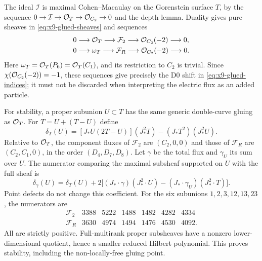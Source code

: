 The ideal $\mathcal I$ is maximal Cohen--Macaulay on the Gorenstein
surface $T$, by the sequence
$0\to\mathcal I\to\mathcal O_T\to\mathcal O_{C_2}\to0$ and the depth lemma.
Duality gives pure sheaves in \eqref{eq:x9-glued-sheaves} and sequences
\begin{equation}
 \begin{aligned}
 0&\longrightarrow\mathcal O_T\longrightarrow\mathcal F_2
       \longrightarrow\mathcal O_{C_2}(-2)\longrightarrow0,\\
 0&\longrightarrow\omega_T\longrightarrow\mathcal F_R
       \longrightarrow\mathcal O_{C_2}(-2)\longrightarrow0.
 \end{aligned}
 \label{eq:x9-glued-extensions}
\end{equation}
Here $\omega_T=\mathcal O_T(P_6)=\mathcal O_T(C_1)$, and its restriction to
$C_2$ is trivial. Since $\chi(\mathcal O_{C_2}(-2))=-1$, these sequences
give precisely the D0 shift in \eqref{eq:x9-glued-indices}; it must
not be discarded when interpreting the electric flux as an added
particle.

For stability, a proper subunion $U\subset T$ has the same generic
double-curve gluing as $\mathcal O_T$. For $T=U+(T-U)$ define
\[
 \delta_T(U)=[J_*U(2T-U)](J_*^2T)-(J_*T^2)(J_*^2U).
\]
Relative to $\mathcal O_T$, the component
fluxes of $\mathcal F_2$ are $(C_2,0,0)$ and those of
$\mathcal F_R$ are $(C_2,C_1,0)$, in the order $(D_4,D_7,D_8)$.
Let $\gamma$ be the total flux and $\gamma_U$ its sum over $U$.
The numerator comparing the maximal subsheaf supported on $U$ with
the full sheaf is
\begin{equation}
 \delta_{\gamma}(U)=\delta_T(U)
   +2\big[(J_*\cdot\gamma)(J_*^2\cdot U)
          -(J_*\cdot\gamma_U)(J_*^2\cdot T)\big].
 \label{eq:x9-glued-stability}
\end{equation}
Point defects do not change this coefficient. For the six subunions
$1,2,3,12,13,23$, the numerators are
\begin{equation}
 \begin{array}{c|rrrrrr}
 \mathcal F_2&3388&5222&1488&1482&4282&4334\\
 \mathcal F_R&3630&4974&1494&1476&4530&4092 .
 \end{array}
 \label{eq:x9-glued-stability-data}
\end{equation}
All are strictly positive. Full-multirank proper subsheaves have a
nonzero lower-dimensional quotient, hence a smaller reduced Hilbert
polynomial. This proves stability, including the non-locally-free
gluing point.

